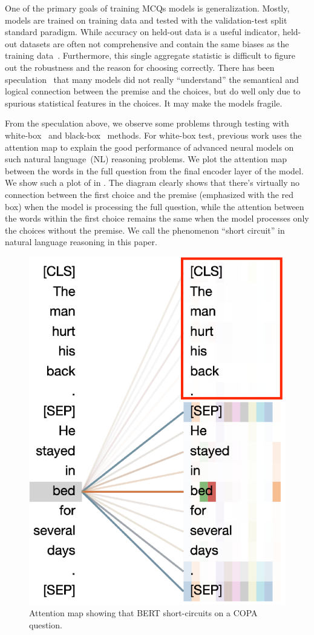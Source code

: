 One of the primary goals of training MCQs models is generalization. 
Mostly, models are trained on training data and tested with the validation-test split standard paradigm. 
While accuracy on held-out data is a useful
indicator, held-out datasets are often not comprehensive 
and contain the same biases as the training
data~\cite{mccoy2019right}. Furthermore, this single aggregate statistic is
 difficult to figure out the robustness and the reason for choosing correctly. 
 There has been speculation~\cite{endingonly1,srinivasan2018simple,zellers2018swag} that many models did not
really ``understand'' the semantical and logical connection between
the premise and the choices, 
but do well only due to spurious statistical features in the choices. 
It may make the models fragile.

From the speculation above, we observe some problems through testing
with  white-box~\cite{vig-2019-multiscale} and black-box~\cite{ribeiro-etal-2020-beyond} methods. 
For white-box test, previous work uses the attention map to explain the good performance
of advanced neural models on such natural language~(NL) reasoning problems. 
We plot the attention map between the words in the full question 
from the final encoder layer of the model. We show
such a plot of  in .
The diagram clearly shows that there's virtually no connection
between the first choice and the premise (emphasized with the red box) when the model is processing
the full question, while the attention between the words within the
first choice remains the same when the model processes only the choices
without the premise. 
We call the phenomenon ``short circuit'' in
natural language reasoning in this paper.

\begin{figure}[th!]
\centering
\includegraphics[width=0.6\columnwidth]{figure/end_related.eps}
\caption{Attention map showing that BERT short-circuits on a COPA question.}
\label{fig:att-goodex}
\end{figure}

